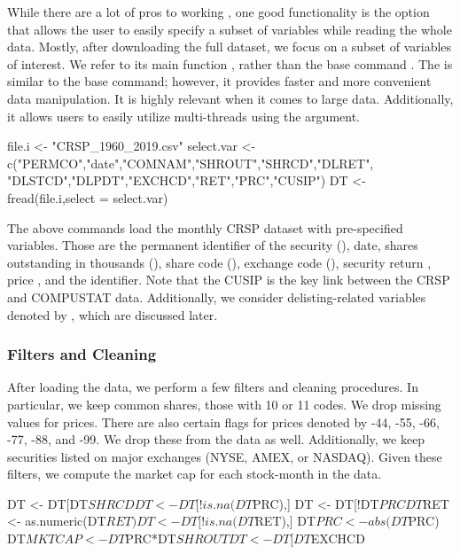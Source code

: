 While there are a lot of pros to working , one good
functionality is the option that allows the user to easily specify a
subset of variables while reading the whole data. Mostly, after
downloading the full dataset, we focus on a subset of variables of
interest. 
{\color{black}
We refer to its main function  , rather than the base command . The  is similar to the base command; however, it provides faster and more convenient data manipulation. It is highly relevant when it comes to large data. Additionally, it allows users to easily utilize multi-threads using the   argument.
}

\begin{Schunk}
\begin{Sinput}
file.i <- "CRSP_1960_2019.csv"
select.var <- c("PERMCO","date","COMNAM","SHROUT","SHRCD","DLRET",
                "DLSTCD","DLPDT","EXCHCD","RET","PRC","CUSIP")
DT  <- fread(file.i,select = select.var)
\end{Sinput}
\end{Schunk}
The above commands load the monthly CRSP dataset with pre-specified
variables. Those are the permanent identifier of the security
(), date, shares outstanding in thousands
(), share code (), exchange code
(), security return , price , and
the  identifier. Note that the CUSIP is the key link
between the CRSP and COMPUSTAT data. Additionally, we consider
delisting-related variables denoted by , which are discussed later.

\hypertarget{filters-and-cleaning}{%
\subsubsection{Filters and Cleaning}\label{filters-and-cleaning}}

After loading the data, we perform a few filters and cleaning procedures.
In particular, we keep common shares, those with 10 or 11 codes. We drop
missing values for prices. There are also certain flags for prices
denoted by -44, -55, -66, -77, -88, and -99. We drop these from the data
as well. Additionally, we keep securities listed on major exchanges
(NYSE, AMEX, or NASDAQ). Given these filters, we compute the market cap
for each stock-month in the data.

\begin{Schunk}
\begin{Sinput}
DT <- DT[DT$SHRCD %
DT <- DT[!is.na(DT$PRC),]
DT <- DT[!DT$PRC %
DT$RET <- as.numeric(DT$RET)
DT <- DT[!is.na(DT$RET),]
DT$PRC <- abs(DT$PRC)
DT$MKTCAP <- DT$PRC*DT$SHROUT
DT <- DT[DT$EXCHCD %
\end{Sinput}
\end{Schunk}

